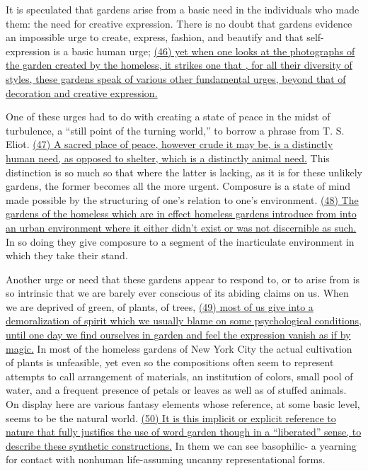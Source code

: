 It is speculated that gardens arise from a basic need in the individuals who made them: the need for creative expression. There is no doubt that gardens evidence an impossible urge to create, express, fashion, and beautify and that self-expression is a basic human urge; \ul{(46) yet when one looks at the photographs of the garden created by the homeless, it strikes one that , for all their diversity of styles, these gardens speak of various other fundamental urges, beyond that of decoration and creative expression.}

One of these urges had to do with creating a state of peace in the midst of turbulence, a “still point of the turning world,” to borrow a phrase from T. S. Eliot. \ul{(47) A sacred place of peace, however crude it may be, is a distinctly human need, as opposed to shelter, which is a distinctly animal need.} This distinction is so much so that where the latter is lacking, as it is for these unlikely gardens, the former becomes all the more urgent. Composure is a state of mind made possible by the structuring of one’s relation to one’s environment. \ul{(48) The gardens of the homeless which are in effect homeless gardens introduce from into an urban environment where it either didn’t exist or was not discernible as such.} In so doing they give composure to a segment of the inarticulate environment in which they take their stand.

Another urge or need that these gardens appear to respond to, or to arise from is so intrinsic that we are barely ever conscious of its abiding claims on us. When we are deprived of green, of plants, of trees, \ul{(49) most of us give into a demoralization of spirit which we usually blame on some psychological conditions, until one day we find ourselves in garden and feel the expression vanish as if by magic.} In most of the homeless gardens of New York City the actual cultivation of plants is unfeasible, yet even so the compositions often seem to represent attempts to call arrangement of materials, an institution of colors, small pool of water, and a frequent presence of petals or leaves as well as of stuffed animals. On display here are various fantasy elements whose reference, at some basic level, seems to be the natural world. \ul{(50) It is this implicit or explicit reference to nature that fully justifies the use of word garden though in a “liberated” sense, to describe these synthetic constructions.} In them we can see basophilic- a yearning for contact with nonhuman life-assuming uncanny representational forms.

